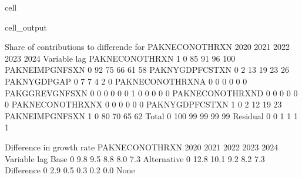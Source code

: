 \documentclass[letterpaper,10pt,english]{jupyterBook}
\begin{document}
\begin{sphinxuseclass}{cell}
\begin{sphinxVerbatimOutput}
\begin{sphinxuseclass}{cell_output}
\begin{sphinxVerbatim}[commandchars=\\\{\}]
 Share of contributions to differende for  PAKNECONOTHRXN
                            2020        2021        2022        2023        2024
Variable         lag                                                            
PAKNECONOTHRXN   \PYGZhy{}1          \PYGZhy{}0\PYGZpc{}         85\PYGZpc{}         91\PYGZpc{}         96\PYGZpc{}        100\PYGZpc{}
PAKNEIMPGNFSXN    0          92\PYGZpc{}         75\PYGZpc{}         66\PYGZpc{}         61\PYGZpc{}         58\PYGZpc{}
PAKNYGDPFCSTXN    0           2\PYGZpc{}         13\PYGZpc{}         19\PYGZpc{}         23\PYGZpc{}         26\PYGZpc{}
PAKNYGDPGAP\PYGZus{}      0           7\PYGZpc{}          7\PYGZpc{}          4\PYGZpc{}          2\PYGZpc{}          0\PYGZpc{}
PAKNECONOTHRXN\PYGZus{}A  0          \PYGZhy{}0\PYGZpc{}         \PYGZhy{}0\PYGZpc{}         \PYGZhy{}0\PYGZpc{}         \PYGZhy{}0\PYGZpc{}         \PYGZhy{}0\PYGZpc{}
PAKGGREVGNFSXN    0          \PYGZhy{}0\PYGZpc{}         \PYGZhy{}0\PYGZpc{}         \PYGZhy{}0\PYGZpc{}         \PYGZhy{}0\PYGZpc{}         \PYGZhy{}0\PYGZpc{}
                 \PYGZhy{}1          \PYGZhy{}0\PYGZpc{}         \PYGZhy{}0\PYGZpc{}         \PYGZhy{}0\PYGZpc{}         \PYGZhy{}0\PYGZpc{}         \PYGZhy{}0\PYGZpc{}
PAKNECONOTHRXN\PYGZus{}D  0          \PYGZhy{}0\PYGZpc{}         \PYGZhy{}0\PYGZpc{}         \PYGZhy{}0\PYGZpc{}         \PYGZhy{}0\PYGZpc{}         \PYGZhy{}0\PYGZpc{}
PAKNECONOTHRXN\PYGZus{}X  0          \PYGZhy{}0\PYGZpc{}         \PYGZhy{}0\PYGZpc{}         \PYGZhy{}0\PYGZpc{}         \PYGZhy{}0\PYGZpc{}         \PYGZhy{}0\PYGZpc{}
PAKNYGDPFCSTXN   \PYGZhy{}1          \PYGZhy{}0\PYGZpc{}         \PYGZhy{}2\PYGZpc{}        \PYGZhy{}12\PYGZpc{}        \PYGZhy{}19\PYGZpc{}        \PYGZhy{}23\PYGZpc{}
PAKNEIMPGNFSXN   \PYGZhy{}1          \PYGZhy{}0\PYGZpc{}        \PYGZhy{}80\PYGZpc{}        \PYGZhy{}70\PYGZpc{}        \PYGZhy{}65\PYGZpc{}        \PYGZhy{}62\PYGZpc{}
Total             0         100\PYGZpc{}         99\PYGZpc{}         99\PYGZpc{}         99\PYGZpc{}         99\PYGZpc{}
Residual          0           0\PYGZpc{}         \PYGZhy{}1\PYGZpc{}         \PYGZhy{}1\PYGZpc{}         \PYGZhy{}1\PYGZpc{}         \PYGZhy{}1\PYGZpc{}

 Difference in growth rate PAKNECONOTHRXN
                       2020        2021        2022        2023        2024
Variable    lag                                                            
Base        0          9.8\PYGZpc{}        9.5\PYGZpc{}        8.8\PYGZpc{}        8.0\PYGZpc{}        7.3\PYGZpc{}
Alternative 0         12.8\PYGZpc{}       10.1\PYGZpc{}        9.2\PYGZpc{}        8.2\PYGZpc{}        7.3\PYGZpc{}
Difference  0          2.9\PYGZpc{}        0.5\PYGZpc{}        0.3\PYGZpc{}        0.2\PYGZpc{}        0.0\PYGZpc{}
None


\end{sphinxVerbatim}
\end{sphinxuseclass}
\end{sphinxVerbatimOutput}
\end{sphinxuseclass}
\end{document}
